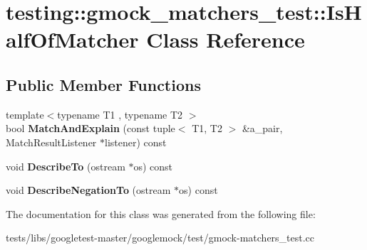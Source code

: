 \hypertarget{classtesting_1_1gmock__matchers__test_1_1IsHalfOfMatcher}{}\section{testing\+:\+:gmock\+\_\+matchers\+\_\+test\+:\+:Is\+Half\+Of\+Matcher Class Reference}
\label{classtesting_1_1gmock__matchers__test_1_1IsHalfOfMatcher}
\subsection*{Public Member Functions}
\begin{DoxyCompactItemize}
\item 
\mbox{\label{classtesting_1_1gmock__matchers__test_1_1IsHalfOfMatcher_a8c919d71f6f7e05ac76c67f37107808c}} 
{\footnotesize template$<$typename T1 , typename T2 $>$ }\\bool {\bfseries Match\+And\+Explain} (const tuple$<$ T1, T2 $>$ \&a\+\_\+pair, Match\+Result\+Listener $\ast$listener) const
\item 
\mbox{\label{classtesting_1_1gmock__matchers__test_1_1IsHalfOfMatcher_aaf62b9984288cc339599286352d82e91}} 
void {\bfseries Describe\+To} (ostream $\ast$os) const
\item 
\mbox{\label{classtesting_1_1gmock__matchers__test_1_1IsHalfOfMatcher_a759ba45c89acfa77a4e1afe95e7b768d}} 
void {\bfseries Describe\+Negation\+To} (ostream $\ast$os) const
\end{DoxyCompactItemize}


The documentation for this class was generated from the following file\+:\begin{DoxyCompactItemize}
\item 
tests/libs/googletest-\/master/googlemock/test/gmock-\/matchers\+\_\+test.\+cc\end{DoxyCompactItemize}
